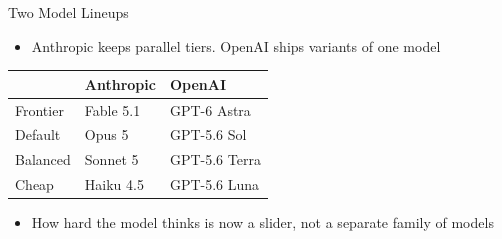 \documentclass[aspectratio=169]{beamer}
\begin{document}
\begin{frame}{Two Model Lineups}
    \begin{itemize}
        \item Anthropic keeps parallel tiers. OpenAI ships variants of one model
    \end{itemize}

    \vspace{0.8em}
    \begin{center}
    \small
    \begin{tabular}{lll}
        \toprule
        & Anthropic & OpenAI \\
        \midrule
        Frontier      & Fable 5.1   & GPT-6 Astra \\
        Default       & Opus 5      & GPT-5.6 Sol \\
        Balanced      & Sonnet 5    & GPT-5.6 Terra \\
        Cheap         & Haiku 4.5   & GPT-5.6 Luna \\
        \bottomrule
    \end{tabular}
    \end{center}

    \vspace{0.8em}
    \begin{itemize}
        \item How hard the model thinks is now a slider, not a separate family of models
    \end{itemize}
\end{frame}
\end{document}
